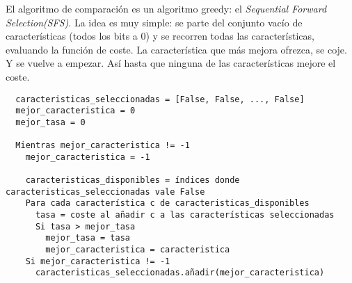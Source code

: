 El algoritmo de comparación es un algoritmo greedy: el \emph{Sequential Forward Selection(SFS)}. La idea es muy simple: se parte del conjunto vacío de características (todos los bits a 0) y se recorren todas las características, evaluando la función de coste. La característica que más mejora ofrezca, se coje. Y se vuelve a empezar. Así hasta que ninguna de las características mejore el coste.

\begin{verbatim}
  caracteristicas_seleccionadas = [False, False, ..., False]
  mejor_caracteristica = 0
  mejor_tasa = 0

  Mientras mejor_caracteristica != -1
    mejor_caracteristica = -1

    caracteristicas_disponibles = índices donde caracteristicas_seleccionadas vale False
    Para cada característica c de caracteristicas_disponibles
      tasa = coste al añadir c a las características seleccionadas
      Si tasa > mejor_tasa
        mejor_tasa = tasa
        mejor_caracteristica = caracteristica
    Si mejor_caracteristica != -1
      caracteristicas_seleccionadas.añadir(mejor_caracteristica)
\end{verbatim}
